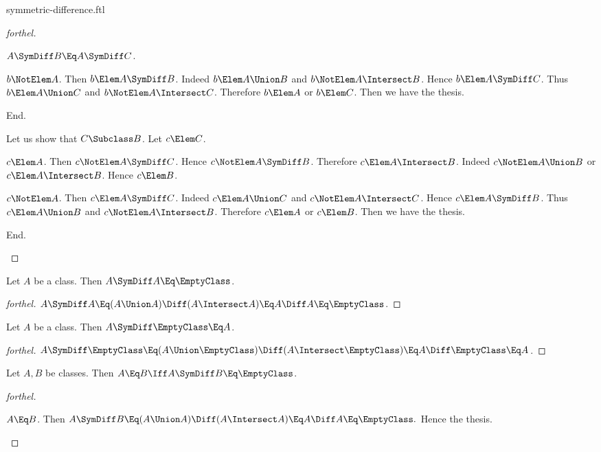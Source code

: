 \documentclass{stex}
\begin{document}
\begin{smodule}{symmetric-difference.ftl}
\begin{proof}[forthel]
\begin{case}{$A \SymDiff B \Eq A \SymDiff C$.}
      \begin{case}{$b \NotElem A$.}
        Then $b \Elem A \SymDiff B$.
        Indeed $b \Elem A \Union B$ and $b \NotElem A \Intersect B$.
        Hence $b \Elem A \SymDiff C$.
        Thus $b \Elem A \Union C$ and $b \NotElem A \Intersect C$.
        Therefore $b \Elem A$ or $b \Elem C$.
        Then we have the thesis.
      \end{case}
    End.

    Let us show that $C \Subclass B$.
      Let $c \Elem C$.

      \begin{case}{$c \Elem A$.}
        Then $c \NotElem A \SymDiff C$.
        Hence $c \NotElem A \SymDiff B$.
        Therefore $c \Elem A \Intersect B$.
        Indeed $c \NotElem A \Union B$ or $c \Elem A \Intersect B$.
        Hence $c \Elem B$.
      \end{case}

      \begin{case}{$c \NotElem A$.}
        Then $c \Elem A \SymDiff C$.
        Indeed $c \Elem A \Union C$ and $c \NotElem A \Intersect C$.
        Hence $c \Elem A \SymDiff B$.
        Thus $c \Elem A \Union B$ and $c \NotElem A \Intersect B$.
        Therefore $c \Elem A$ or $c \Elem B$.
        Then we have the thesis.
      \end{case}
    End.
  \end{case}
\end{proof}

\begin{proposition*}[forthel]
  Let $A$ be a class.
  Then $A \SymDiff A \Eq \EmptyClass$.
\end{proposition*}
\begin{proof}[forthel]
  $A \SymDiff A
    \Eq (A \Union A) \Diff (A \Intersect A)
    \Eq A \Diff A
    \Eq \EmptyClass$.
\end{proof}

\begin{proposition*}[forthel]
  Let $A$ be a class.
  Then $A \SymDiff \EmptyClass \Eq A$.
\end{proposition*}
\begin{proof}[forthel]
  $A \SymDiff \EmptyClass
    \Eq (A \Union \EmptyClass) \Diff (A \Intersect \EmptyClass)
    \Eq A \Diff \EmptyClass
    \Eq A$.
\end{proof}

\begin{proposition*}[forthel]
  Let $A, B$ be classes.
  Then $A \Eq B \Iff A \SymDiff B \Eq \EmptyClass$.
\end{proposition*}
\begin{proof}[forthel]
  \begin{case}{$A \Eq B$.}
    Then $A \SymDiff B
      \Eq (A \Union A) \Diff (A \Intersect A)
      \Eq A \Diff A
      \Eq \EmptyClass.$
    Hence the thesis.
  \end{case}


\end{proof}
\end{smodule}
\end{document}
